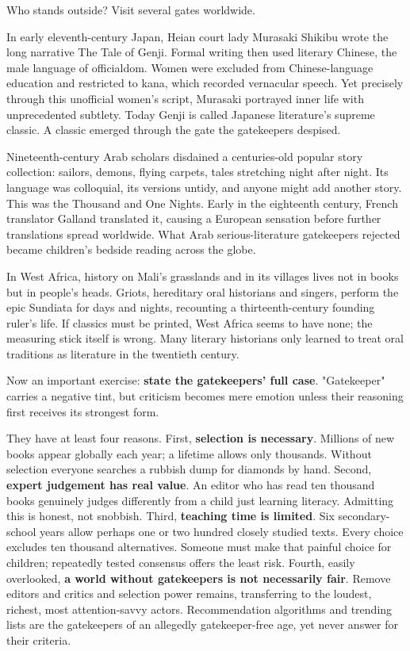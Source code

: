 Who stands outside? Visit several gates worldwide.

In early eleventh-century Japan, Heian court lady Murasaki Shikibu wrote the long narrative The Tale of Genji. Formal writing then used literary Chinese, the male language of officialdom. Women were excluded from Chinese-language education and restricted to kana, which recorded vernacular speech. Yet precisely through this unofficial women's script, Murasaki portrayed inner life with unprecedented subtlety. Today Genji is called Japanese literature's supreme classic. A classic emerged through the gate the gatekeepers despised.

Nineteenth-century Arab scholars disdained a centuries-old popular story collection: sailors, demons, flying carpets, tales stretching night after night. Its language was colloquial, its versions untidy, and anyone might add another story. This was the Thousand and One Nights. Early in the eighteenth century, French translator Galland translated it, causing a European sensation before further translations spread worldwide. What Arab serious-literature gatekeepers rejected became children's bedside reading across the globe.

In West Africa, history on Mali's grasslands and in its villages lives not in books but in people's heads. Griots, hereditary oral historians and singers, perform the epic Sundiata for days and nights, recounting a thirteenth-century founding ruler's life. If classics must be printed, West Africa seems to have none; the measuring stick itself is wrong. Many literary historians only learned to treat oral traditions as literature in the twentieth century.

Now an important exercise: \textbf{state the gatekeepers' full case}. "Gatekeeper" carries a negative tint, but criticism becomes mere emotion unless their reasoning first receives its strongest form.

They have at least four reasons. First, \textbf{selection is necessary}. Millions of new books appear globally each year; a lifetime allows only thousands. Without selection everyone searches a rubbish dump for diamonds by hand. Second, \textbf{expert judgement has real value}. An editor who has read ten thousand books genuinely judges differently from a child just learning literacy. Admitting this is honest, not snobbish. Third, \textbf{teaching time is limited}. Six secondary-school years allow perhaps one or two hundred closely studied texts. Every choice excludes ten thousand alternatives. Someone must make that painful choice for children; repeatedly tested consensus offers the least risk. Fourth, easily overlooked, \textbf{a world without gatekeepers is not necessarily fair}. Remove editors and critics and selection power remains, transferring to the loudest, richest, most attention-savvy actors. Recommendation algorithms and trending lists are the gatekeepers of an allegedly gatekeeper-free age, yet never answer for their criteria.

